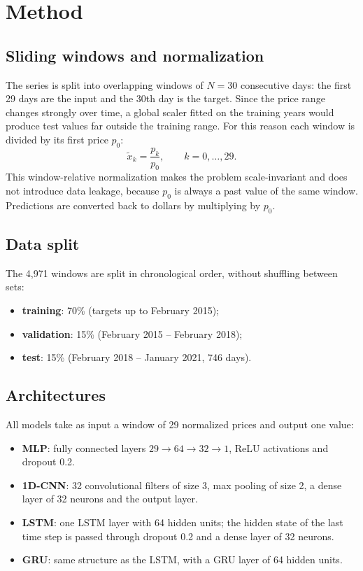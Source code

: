 \documentclass[11pt,a4paper]{article}
\begin{document}
\section{Method}

\subsection{Sliding windows and normalization}
The series is split into overlapping windows of $N = 30$ consecutive days: the first 29 days are the input and the 30th day is the target. Since the price range changes strongly over time, a global scaler fitted on the training years would produce test values far outside the training range. For this reason each window is divided by its first price $p_0$:
\begin{equation}
  \tilde{x}_k = \frac{p_k}{p_0}, \qquad k = 0, \dots, 29 .
\end{equation}
This window-relative normalization makes the problem scale-invariant and does not introduce data leakage, because $p_0$ is always a past value of the same window. Predictions are converted back to dollars by multiplying by $p_0$.

\subsection{Data split}
The 4{,}971 windows are split in chronological order, without shuffling between sets:
\begin{itemize}
  \item \textbf{training}: 70\% (targets up to February 2015);
  \item \textbf{validation}: 15\% (February 2015 -- February 2018);
  \item \textbf{test}: 15\% (February 2018 -- January 2021, 746 days).
\end{itemize}

\subsection{Architectures}
All models take as input a window of 29 normalized prices and output one value:
\begin{itemize}
  \item \textbf{MLP}: fully connected layers $29 \rightarrow 64 \rightarrow 32 \rightarrow 1$, ReLU activations and dropout 0.2.
  \item \textbf{1D-CNN}: 32 convolutional filters of size 3, max pooling of size 2, a dense layer of 32 neurons and the output layer.
  \item \textbf{LSTM}: one LSTM layer with 64 hidden units; the hidden state of the last time step is passed through dropout 0.2 and a dense layer of 32 neurons.
  \item \textbf{GRU}: same structure as the LSTM, with a GRU layer of 64 hidden units.
\end{itemize}
\end{document}
